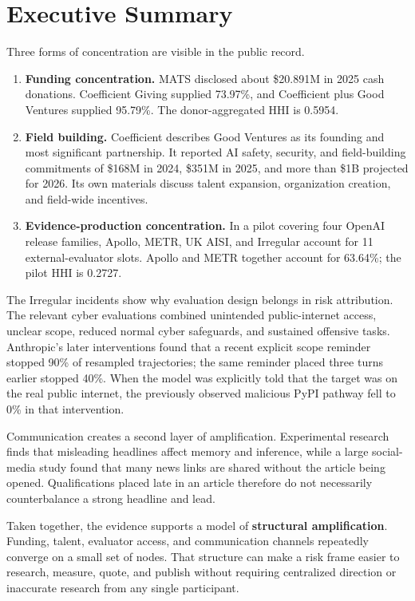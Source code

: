 \documentclass[11pt,twoside]{article}
\begin{document}
\tableofcontents
\clearpage

\section{Executive Summary}
Three forms of concentration are visible in the public record.

\begin{enumerate}
\item \textbf{Funding concentration.} MATS disclosed about \$20.891M in 2025 cash donations. Coefficient Giving supplied 73.97\%, and Coefficient plus Good Ventures supplied 95.79\%. The donor-aggregated HHI is 0.5954.
\item \textbf{Field building.} Coefficient describes Good Ventures as its founding and most significant partnership. It reported AI safety, security, and field-building commitments of \$168M in 2024, \$351M in 2025, and more than \$1B projected for 2026. Its own materials discuss talent expansion, organization creation, and field-wide incentives.
\item \textbf{Evidence-production concentration.} In a pilot covering four OpenAI release families, Apollo, METR, UK AISI, and Irregular account for 11 external-evaluator slots. Apollo and METR together account for 63.64\%; the pilot HHI is 0.2727.
\end{enumerate}

The Irregular incidents show why evaluation design belongs in risk attribution. The relevant cyber evaluations combined unintended public-internet access, unclear scope, reduced normal cyber safeguards, and sustained offensive tasks. Anthropic's later interventions found that a recent explicit scope reminder stopped 90\% of resampled trajectories; the same reminder placed three turns earlier stopped 40\%. When the model was explicitly told that the target was on the real public internet, the previously observed malicious PyPI pathway fell to 0\% in that intervention.

Communication creates a second layer of amplification. Experimental research finds that misleading headlines affect memory and inference, while a large social-media study found that many news links are shared without the article being opened. Qualifications placed late in an article therefore do not necessarily counterbalance a strong headline and lead.

Taken together, the evidence supports a model of \textbf{structural amplification}. Funding, talent, evaluator access, and communication channels repeatedly converge on a small set of nodes. That structure can make a risk frame easier to research, measure, quote, and publish without requiring centralized direction or inaccurate research from any single participant.
\end{document}
